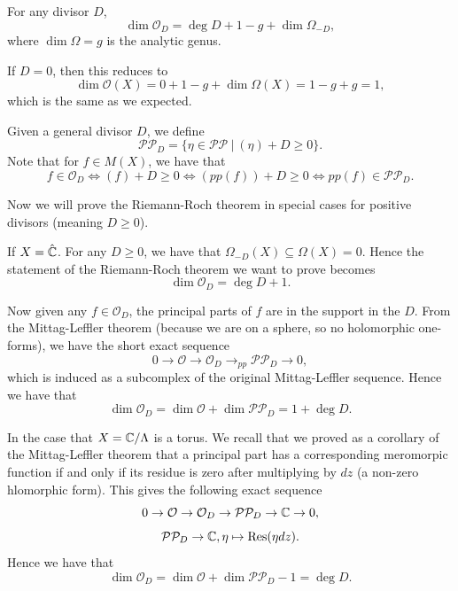\documentclass{article}
\begin{document}
{\begin{theorem}
    For any divisor $D$, 
    \[\dim \mathcal{O}_D = \deg D + 1 - g + \dim \Omega_{-D},\]
    where $\dim \Omega = g$ is the analytic genus. 
\end{theorem}

\begin{corollary}
    If $D = 0$, then this reduces to
    \[\dim \mathcal{O}(X) =  0 + 1 - g + \dim \Omega(X) = 1 - g + g = 1,\]
    which is the same as we expected.
\end{corollary}

\begin{definition}
        Given a general divisor $D$, we define
    \[\mathcal{P}\mathcal{P}_D = \{\eta \in \mathcal{P} \mathcal{P}\ |\ (\eta) + D \geq 0\}. \]
    Note that for $f \in M(X)$, we have that
    \[f \in \mathcal{O}_D \iff (f) + D \geq 0 \iff (pp(f)) + D \geq 0 \iff pp(f) \in \mathcal{P}\mathcal{P}_D.\]
\end{definition}

Now we will prove the Riemann-Roch theorem in special cases for positive divisors (meaning $D \geq 0$).
\begin{example}
    If $X = \hat{\mathbb{C}}$. For any $D \geq 0$, we have that $\Omega_{-D}(X) \subseteq \Omega(X) = 0$. Hence the statement of the Riemann-Roch theorem we want to prove becomes
    \[\dim \mathcal{O}_D = \deg D + 1.\]

    Now given any $f \in \mathcal{O}_D$, the principal parts of $f$ are in the support in the $D$. From the Mittag-Leffler theorem (because we are on a sphere, so no holomorphic one-forms), we have the short exact sequence  
    \[0 \to \mathcal{O} \to \mathcal{O}_D \to_{pp} \mathcal{P} \mathcal{P}_D \to 0,\]
    which is induced as a subcomplex of the original Mittag-Leffler sequence. Hence we have that
    \[\dim \mathcal{O}_D = \dim \mathcal{O} + \dim \mathcal{P} \mathcal{P}_D = 1 + \deg D.\]
\end{example}

\begin{example}
    In the case that $X = \mathbb{C} / \Lambda$ is a torus. We recall that we proved as a corollary of the Mittag-Leffler theorem that a principal part has a corresponding meromorpic function if and only if its residue is zero after multiplying by $dz$ (a non-zero hlomorphic form). This gives the following exact sequence
    \[0 \to \mathcal{O} \to \mathcal{O}_D \to \mathcal{P} \mathcal{P}_D \to \mathbb{C} \to 0,\]
    \[\mathcal{P} \mathcal{P}_D \to \mathbb{C}, \eta \mapsto \operatorname{Res}(\eta dz).\]
    Hence we have that
    \[\dim \mathcal{O}_D = \dim \mathcal{O} + \dim \mathcal{P} \mathcal{P}_D - 1  = \deg D.\]
\end{example}

}
\end{document}
